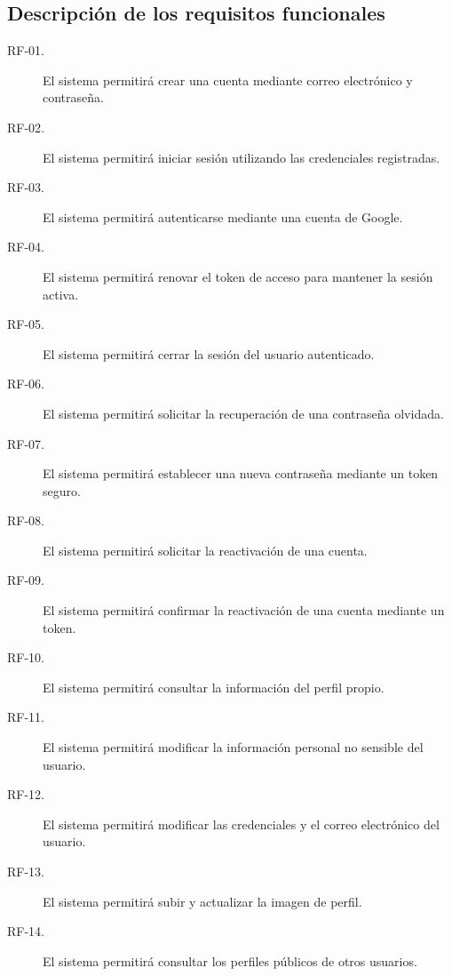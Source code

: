 \subsection{Descripción de los requisitos funcionales}

\begin{description}
    \item[RF-01.] El sistema permitirá crear una cuenta mediante correo electrónico y contraseña.

    \item[RF-02.] El sistema permitirá iniciar sesión utilizando las credenciales registradas.

    \item[RF-03.] El sistema permitirá autenticarse mediante una cuenta de Google.

    \item[RF-04.] El sistema permitirá renovar el token de acceso para mantener la sesión activa.

    \item[RF-05.] El sistema permitirá cerrar la sesión del usuario autenticado.

    \item[RF-06.] El sistema permitirá solicitar la recuperación de una contraseña olvidada.

    \item[RF-07.] El sistema permitirá establecer una nueva contraseña mediante un token seguro.

    \item[RF-08.] El sistema permitirá solicitar la reactivación de una cuenta.

    \item[RF-09.] El sistema permitirá confirmar la reactivación de una cuenta mediante un token.

    \item[RF-10.] El sistema permitirá consultar la información del perfil propio.

    \item[RF-11.] El sistema permitirá modificar la información personal no sensible del usuario.

    \item[RF-12.] El sistema permitirá modificar las credenciales y el correo electrónico del usuario.

    \item[RF-13.] El sistema permitirá subir y actualizar la imagen de perfil.

    \item[RF-14.] El sistema permitirá consultar los perfiles públicos de otros usuarios.


\end{description}
